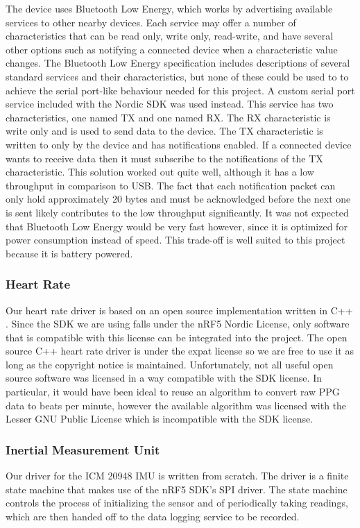 The device uses Bluetooth Low Energy, which works by advertising
available services to other nearby devices. Each service may offer a number
of characteristics that can be read only, write only, read-write, and have 
several other options such as notifying a connected device when a characteristic
value changes. The Bluetooth Low Energy specification includes descriptions of several
standard services and their characteristics, but none of these could be used to
to achieve the serial port-like behaviour needed for this project. A custom
serial port service included with the Nordic SDK was used instead. This service
has two characteristics, one named TX and one named RX. The RX characteristic is
write only and is used to send data to the device. The TX characteristic is
written to only by the device and has notifications enabled. If a connected device
wants to receive data then it must subscribe to the notifications of the TX 
characteristic. This solution worked out quite well, although it has a low 
throughput in comparison to USB. The fact that each notification packet can only 
hold approximately 20 bytes and must be acknowledged before the next one is 
sent likely contributes to the low throughput significantly. It was not expected
that Bluetooth Low Energy would be very fast however, since it is optimized for 
power consumption instead of speed. This trade-off is well suited to this project 
because it is battery powered.

\subsubsection{Heart Rate}

Our heart rate driver is based on an open source implementation written in
C++ \cite{max86150-ardino}. Since the SDK we are using falls under the nRF5
Nordic License, only software that is compatible with this license can be
integrated into the project. The open source C++ heart rate driver is under the
expat license so we are free to use it as long as the copyright notice is
maintained. Unfortunately, not all useful open source software was licensed in
a way compatible with the SDK license. In particular, it would have been ideal
to reuse an algorithm to convert raw PPG data to beats per minute, however the
available algorithm was licensed with the Lesser GNU Public
License \cite{wasp-os} which is incompatible with the SDK license.

\subsubsection{Inertial Measurement Unit}

Our driver for the ICM 20948 IMU is written from scratch. The driver is a finite
state machine that makes use of the nRF5 SDK's SPI driver. The state machine
controls the process of initializing the sensor and of periodically taking
readings, which are then handed off to the data logging service to be recorded.

